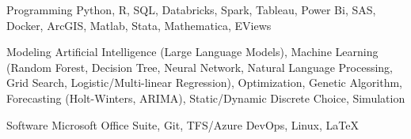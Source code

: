 


\begin{cvskills}


\cvskill
{Programming} %
{Python, R, SQL, Databricks, Spark, Tableau, Power Bi, SAS, Docker, ArcGIS, Matlab, Stata, Mathematica, EViews} %


\cvskill
{Modeling} %
{Artificial Intelligence (Large Language Models), Machine Learning (Random Forest, Decision Tree, Neural Network, Natural Language Processing, Grid Search, Logistic/Multi-linear Regression), Optimization, Genetic Algorithm, Forecasting (Holt-Winters, ARIMA), Static/Dynamic Discrete Choice, Simulation} %


\cvskill
{Software} %
{Microsoft Office Suite, Git, TFS/Azure DevOps, Linux, LaTeX} %


\end{cvskills}